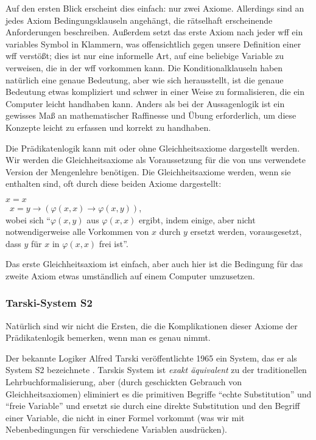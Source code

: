 Auf den ersten Blick erscheint dies einfach: nur zwei Axiome.  Allerdings sind an jedes Axiom Bedingungsklauseln angehängt, die rätselhaft erscheinende Anforderungen beschreiben.  Außerdem setzt das erste Axiom nach jeder wff ein variables Symbol in Klammern, was offensichtlich gegen unsere Definition einer wff verstößt; dies ist nur eine informelle Art, auf eine beliebige Variable zu verweisen, die in der wff vorkommen kann.  Die Konditionalklauseln haben natürlich eine genaue Bedeutung, aber wie sich herausstellt, ist die genaue Bedeutung etwas kompliziert und schwer in einer Weise zu formalisieren, die ein Computer leicht handhaben kann.  Anders als bei der Aussagenlogik ist ein gewisses Maß an mathematischer Raffinesse und Übung erforderlich, um diese Konzepte leicht zu erfassen und korrekt zu handhaben.

Die Prädikatenlogik kann mit oder ohne Gleichheitsaxiome dargestellt werden. Wir werden die Gleichheitsaxiome als Voraussetzung für die von uns verwendete Version der Mengenlehre benötigen.  Die Gleichheitsaxiome werden, wenn sie enthalten sind, oft durch diese beiden Axiome dargestellt:
\begin{center}
$x=x$\\ \
$x=y\rightarrow (\varphi(x,x)\rightarrow\varphi(x,y))$,\\ wobei sich "`$\varphi(x,y)$ aus $\varphi(x,x)$ ergibt, indem einige, aber nicht notwendigerweise alle Vorkommen von $x$ durch $y$ ersetzt werden, vorausgesetzt, dass $y$ für $x$ in $\varphi(x,x)$ frei ist"'.
\end{center}
Das erste Gleichheitsaxiom ist einfach, aber auch hier ist die Bedingung für das zweite Axiom etwas umständlich auf einem Computer umzusetzen.

\subsubsection{Tarski-System S2}

Natürlich sind wir nicht die Ersten, die die Komplikationen dieser Axiome der Prädikatenlogik bemerken, wenn man es genau nimmt.

Der bekannte Logiker Alfred Tarski veröffentlichte 1965 ein System, das er als System S2 bezeichnete \cite[S.~77]{Tarski1965}. Tarskis System ist \textit{exakt äquivalent} zu der traditionellen Lehrbuchformalisierung, aber (durch geschickten Gebrauch von Gleichheitsaxiomen) eliminiert es die primitiven Begriffe "`echte Substitution"' und "`freie Variable"' und ersetzt sie durch eine direkte Substitution und den Begriff einer Variable, die nicht in einer Formel vorkommt (was wir mit Nebenbedingungen für verschiedene Variablen ausdrücken).

